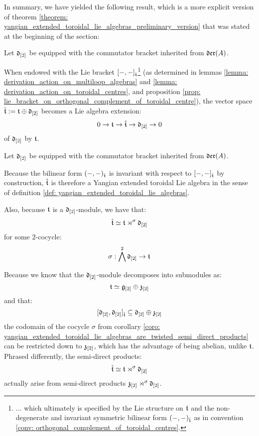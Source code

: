         In summary, we have yielded the following result, which is a more explicit version of theorem \ref{theorem: yangian_extended_toroidal_lie_algebras_preliminary_version} that was stated at the beginning of the section:
        \begin{theorem} \label{theorem: yangian_extended_toroidal_lie_algebras}
            Let $\mathfrak{d}_{[2]}$ be equipped with the commutator bracket inherited from $\mathfrak{der}(A)$.
        
            When endowed with the Lie bracket $[-, -]_{\hat{\mathfrak{t}}}$\footnote{... which ultimately is specified by the Lie structure on $\mathfrak{t}$ and the non-degenerate and invariant symmetric bilinear form $(-, -)_{\hat{\mathfrak{t}}}$ as in convention \ref{conv: orthogonal_complement_of_toroidal_centres}.} (as determined in lemmas \ref{lemma: derivation_action_on_multiloop_algebras} and \ref{lemma: derivation_action_on_toroidal_centres}, and proposition \ref{prop: lie_bracket_on_orthogonal_complement_of_toroidal_centre}), the vector space $\hat{\mathfrak{t}} := \mathfrak{t} \oplus \mathfrak{d}_{[2]}$ becomes a Lie algebra extension:
                $$0 \to \mathfrak{t} \to \hat{\mathfrak{t}} \to \mathfrak{d}_{[2]} \to 0$$
            of $\mathfrak{d}_{[2]}$ by $\mathfrak{t}$. 
        \end{theorem}
        \begin{corollary} \label{coro: yangian_extended_toroidal_lie_algebras_are_twisted_semi_direct_products}
            Let $\mathfrak{d}_{[2]}$ be equipped with the commutator bracket inherited from $\mathfrak{der}(A)$.
        
            Because the bilinear form $(-, -)_{\hat{\mathfrak{t}}}$ is invariant with respect to $[-, -]_{\hat{\mathfrak{t}}}$ by construction, $\hat{\mathfrak{t}}$ is therefore a Yangian extended toroidal Lie algebra in the sense of definition \ref{def: yangian_extended_toroidal_lie_algebras}.

            Also, because $\mathfrak{t}$ is a $\mathfrak{d}_{[2]}$-module, we have that:
                $$\hat{\mathfrak{t}} \simeq \mathfrak{t} \rtimes^{\sigma} \mathfrak{d}_{[2]}$$
            for some $2$-cocycle:
                $$\sigma: \bigwedge^2 \mathfrak{d}_{[2]} \to \mathfrak{t}$$
        \end{corollary}
        \begin{remark}
            Because we know that the $\mathfrak{d}_{[2]}$-module decomposes into submodules as:
                $$\mathfrak{t} \simeq \mathfrak{g}_{[2]} \oplus \mathfrak{z}_{[2]}$$
            and that:
                $$[\mathfrak{d}_{[2]}, \mathfrak{d}_{[2]}]_{\hat{\mathfrak{t}}} \subseteq \mathfrak{d}_{[2]} \oplus \mathfrak{z}_{[2]}$$
            the codomain of the cocycle $\sigma$ from corollary \ref{coro: yangian_extended_toroidal_lie_algebras_are_twisted_semi_direct_products} can be restricted down to $\mathfrak{z}_{[2]}$, which has the advantage of being abelian, unlike $\mathfrak{t}$. Phrased differently, the semi-direct products:
                $$\hat{\mathfrak{t}} \simeq \mathfrak{t} \rtimes^{\sigma} \mathfrak{d}_{[2]}$$
            actually arise from semi-direct products $\mathfrak{z}_{[2]} \rtimes^{\sigma} \mathfrak{d}_{[2]}$.  
        \end{remark}
        
